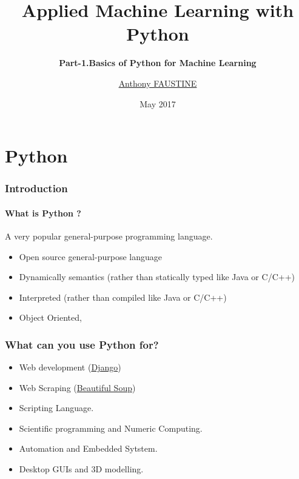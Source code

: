 \documentclass{bredelebeamer}
\title[PhD]{\textbf{Applied Machine Learning with Python}}
\subtitle{\textbf{Part-1.Basics of Python for Machine Learning} }
\author{ \href{https://sambaiga.github.io/ }{\href{https://sambaiga.github.io/}{Anthony FAUSTINE} }}
\date{May 2017}
\begin{document}
\begin{frame}
	\titlepage
\end{frame}







\section{Python}

\begin{frame}\frametitle{Introduction}
\framesubtitle{What is Python ?}
A very popular general-purpose programming language.
\begin{itemize}
\item Open source general-purpose language
\item Dynamically semantics (rather than statically typed like Java or C/C++)
\item Interpreted (rather than compiled like Java or C/C++)
\item Object Oriented, 
\end{itemize}
\end{frame}	

\begin{frame}\frametitle{What can you use Python for?}

\begin{itemize}
\item Web development (\href{https://www.djangoproject.com/}{Django})
\item Web Scraping (\href{https://www.djangoproject.com/}{Beautiful Soup})
\item Scripting Language.
\item Scientific programming and Numeric Computing.
\item Automation and Embedded Sytstem.
\item Desktop GUIs and 3D modelling. 
\end{itemize}
\end{frame}	
	
\end{document}
